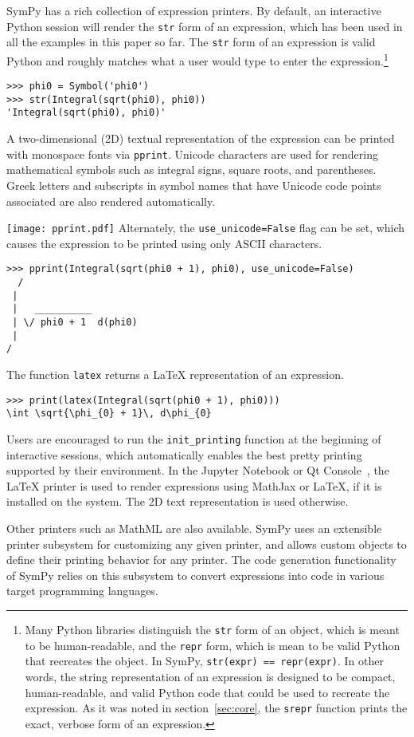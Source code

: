 SymPy has a rich collection of expression printers. By default, an interactive
Python session will render the \verb|str| form of an expression, which has
been used in all the examples in this paper so far. The \verb|str| form of an
expression is valid Python and roughly matches what a user would type to enter
the expression.\footnote{Many Python libraries distinguish the \texttt{str}
  form of an object, which is meant to be human-readable, and the
  \texttt{repr} form, which is mean to be valid Python that recreates the
  object. In SymPy, \texttt{str(expr) == repr(expr)}. In other words, the
  string representation of an expression is designed to be compact,
  human-readable, and valid Python code that could be used to recreate the
  expression. As it was noted in section~\ref{sec:core}, the \texttt{srepr}
  function prints the exact, verbose form of an expression.}

\begin{verbatim}
>>> phi0 = Symbol('phi0')
>>> str(Integral(sqrt(phi0), phi0))
'Integral(sqrt(phi0), phi0)'
\end{verbatim}

A two-dimensional (2D) textual representation of the expression can
be printed with monospace fonts via \verb|pprint|.
Unicode characters are used for rendering mathematical symbols such as integral signs,
square roots, and parentheses. Greek letters and subscripts in symbol names
that have Unicode code points associated
are also rendered automatically.

\noindent
\texttt{[image: pprint.pdf]}
Alternately, the \verb|use_unicode=False| flag can be set, which causes the
expression to be printed using only ASCII characters.

\begin{verbatim}
>>> pprint(Integral(sqrt(phi0 + 1), phi0), use_unicode=False)
  /
 |
 |   __________
 | \/ phi0 + 1  d(phi0)
 |
/
\end{verbatim}

The function \verb|latex| returns a \LaTeX{} representation of an expression.

\begin{verbatim}
>>> print(latex(Integral(sqrt(phi0 + 1), phi0)))
\int \sqrt{\phi_{0} + 1}\, d\phi_{0}
\end{verbatim}

Users are encouraged to run the \verb|init_printing| function at the beginning
of interactive sessions, which automatically enables the best pretty printing
supported by their environment. In the Jupyter Notebook or Qt
Console~\cite{perez2007ipython}, the \LaTeX{} printer is used to render
expressions using MathJax or \LaTeX{}, if it is installed on the system. The
2D text representation is used otherwise.

Other printers such as MathML are also available. SymPy uses an extensible
printer subsystem for customizing any given
printer, and allows custom objects to define their printing behavior for any
printer. The code generation functionality of SymPy
relies on this subsystem to convert expressions into code in various target
programming languages.
